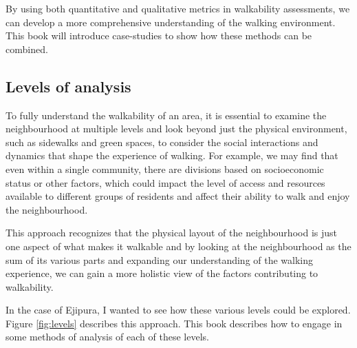 \documentclass[
]{latex/krantz}
\begin{document}
By using both quantitative and qualitative metrics in walkability assessments, we can develop a more comprehensive understanding of the walking environment. This book will introduce case-studies to show how these methods can be combined.

\hypertarget{levels}{%
\subsection{Levels of analysis}\label{levels}}

To fully understand the walkability of an area, it is essential to examine the neighbourhood at multiple levels and look beyond just the physical environment, such as sidewalks and green spaces, to consider the social interactions and dynamics that shape the experience of walking. For example, we may find that even within a single community, there are divisions based on socioeconomic status or other factors, which could impact the level of access and resources available to different groups of residents and affect their ability to walk and enjoy the neighbourhood.

This approach recognizes that the physical layout of the neighbourhood is just one aspect of what makes it walkable and by looking at the neighbourhood as the sum of its various parts and expanding our understanding of the walking experience, we can gain a more holistic view of the factors contributing to walkability.

In the case of Ejipura, I wanted to see how these various levels could be explored. Figure \ref{fig:levels} describes this approach. This book describes how to engage in some methods of analysis of each of these levels.
\end{document}
